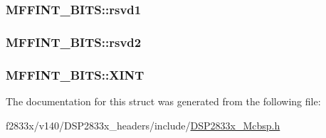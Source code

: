 \subsubsection[{rsvd1}]{ M\+F\+F\+I\+N\+T\+\_\+\+B\+I\+T\+S\+::rsvd1}\label{struct_m_f_f_i_n_t___b_i_t_s_ae615fbf6ac4624a8edcf32a4b6500648}
\hypertarget{struct_m_f_f_i_n_t___b_i_t_s_a6553e7674a77763dee29b597db063953}{}
\subsubsection[{rsvd2}]{ M\+F\+F\+I\+N\+T\+\_\+\+B\+I\+T\+S\+::rsvd2}\label{struct_m_f_f_i_n_t___b_i_t_s_a6553e7674a77763dee29b597db063953}
\hypertarget{struct_m_f_f_i_n_t___b_i_t_s_acd0790c62473cd01e0e59e9d39a7a2ce}{}
\subsubsection[{X\+I\+N\+T}]{ M\+F\+F\+I\+N\+T\+\_\+\+B\+I\+T\+S\+::\+X\+I\+N\+T}\label{struct_m_f_f_i_n_t___b_i_t_s_acd0790c62473cd01e0e59e9d39a7a2ce}


The documentation for this struct was generated from the following file\+:\begin{DoxyCompactItemize}
\item 
f2833x/v140/\+D\+S\+P2833x\+\_\+headers/include/\hyperlink{_d_s_p2833x___mcbsp_8h}{D\+S\+P2833x\+\_\+\+Mcbsp.\+h}\end{DoxyCompactItemize}
